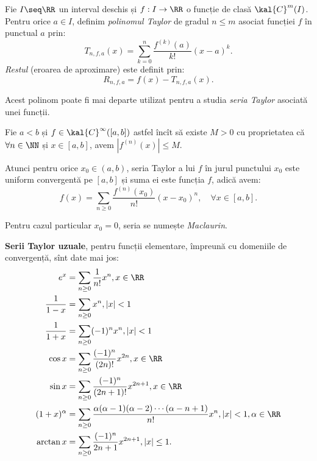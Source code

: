 \begin{definition}\label{def:pol-taylor}
  Fie $ I \seq \RR $ un interval deschis și $ f: I \to \RR $ o funcție de clasă
  $ \kal{C}^m(I) $. Pentru orice $ a \in I $, definim \emph{polinomul Taylor}
  de gradul $ n \leq m $ asociat funcției $ f $ în punctual $ a $ prin:
  \[
    T_{n,f,a}(x) = \sum_{k = 0}^n \frac{f^{(k)}(a)}{k!} (x - a)^k.
  \]
  \emph{Restul} (eroarea de aproximare) este definit prin:
  \[
    R_{n,f,a} = f(x) - T_{n,f,a}(x).
  \]
\end{definition}

Acest polinom poate fi mai departe utilizat pentru a studia \emph{seria Taylor}
asociată unei funcții.

\begin{theorem}\label{thm:seria-taylor}
  Fie $ a < b $ și $ f \in \kal{C}^\infty([a,b]) $ astfel încît să existe
  $ M > 0 $ cu proprietatea că $ \forall n \in \NN $ și $ x \in [a, b] $, avem
  $ |f^{(n)}(x)| \leq M $.

  Atunci pentru orice $ x_0 \in (a,b) $, seria Taylor a lui $ f $ în jurul
  punctului $ x_0 $ este uniform convergentă pe $ [a,b] $ și suma ei este
  funcția $ f $, adică avem:
  \[
    f(x) = \sum_{n \geq 0} \frac{f^{(n)}(x_0)}{n!} (x - x_0)^n, \quad %
    \forall x \in [a,b].
  \]
\end{theorem}

Pentru cazul particular $ x_0 = 0 $, seria se numește \emph{Maclaurin}.

\textbf{Serii Taylor uzuale}, pentru funcții elementare, împreună cu
domeniile de convergență, sînt date mai jos:
\begin{align*}
  e^x &= \sum_{n \geq 0} \dfrac{1}{n!} x^n, x \in \RR \\
  \dfrac{1}{1 - x} &= \sum_{n \geq 0} x^n, |x| < 1 \\
  \dfrac{1}{1 + x} &= \sum_{n \geq 0} (-1)^n x^n, |x| < 1 \\
  \cos x &= \sum_{n \geq 0} \dfrac{(-1)^n}{(2n)!} x^{2n}, x \in \RR \\
  \sin x &= \sum_{n \geq 0} \dfrac{(-1)^n}{(2n + 1)!} x^{2n + 1}, x \in \RR \\
  (1 + x)^\alpha &= \sum_{n \geq 0} \dfrac{\alpha(\alpha - 1)(\alpha - 2) \cdots (\alpha - n + 1)}{n!} x^n,%
                   |x| < 1, \alpha \in \RR \\
  \arctan x &= \sum_{n \geq 0} \dfrac{(-1)^n}{2n + 1} x^{2n + 1}, | x | \leq 1.
\end{align*}

